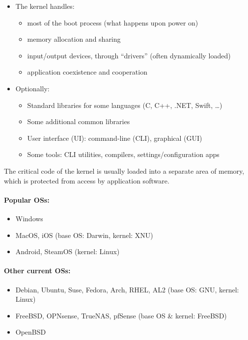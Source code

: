\documentclass[12pt]{article}
\begin{document}
\begin{itemize}
  \item The kernel handles:
  \begin{itemize}
    \item most of the boot process (what happens upon power on)
    \item memory allocation and sharing
    \item input/output devices, through ``drivers'' (often dynamically loaded)
    \item application coexistence and cooperation
  \end{itemize}
  \item Optionally:
  \begin{itemize}
    \item Standard libraries for some languages (C, C++, .NET, Swift, \ldots)
    \item Some additional common libraries
    \item User interface (UI): command-line (CLI), graphical (GUI)
    \item Some tools: CLI utilities, compilers, settings/configuration apps
  \end{itemize}
\end{itemize}
The critical code of the kernel is usually loaded into a separate area of memory, which is protected from access by application software.

\paragraph{Popular OSs:}

\begin{itemize}
  \item Windows
  \item MacOS, iOS (base OS: Darwin, kernel: XNU)
  \item Android, SteamOS (kernel: Linux)
\end{itemize}

\paragraph{Other current OSs:}

\begin{itemize}
  \item Debian, Ubuntu, Suse, Fedora, Arch, RHEL, AL2 (base OS: GNU, kernel: Linux)
  \item FreeBSD, OPNsense, TrueNAS, pfSense (base OS \& kernel: FreeBSD)
  \item OpenBSD
\end{itemize}
\end{document}
